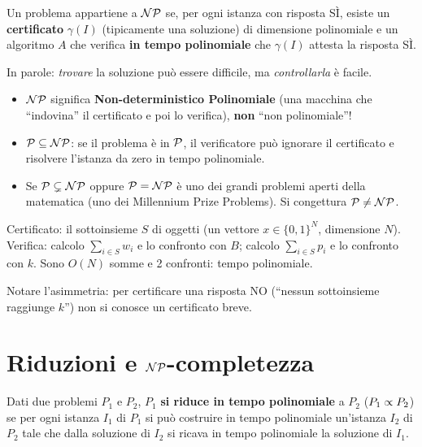 \begin{defbox}[classe $\NP$]
Un problema appartiene a $\NP$ se, per ogni istanza con risposta SÌ, esiste un \textbf{certificato} $\gamma(I)$ (tipicamente una soluzione) di dimensione polinomiale e un algoritmo $A$ che verifica \textbf{in tempo polinomiale} che $\gamma(I)$ attesta la risposta SÌ.
\end{defbox}
In parole: \emph{trovare} la soluzione può essere difficile, ma \emph{controllarla} è facile.

\begin{itemize}[nosep]
\item $\NP$ significa \textbf{Non-deterministico Polinomiale} (una macchina che ``indovina'' il certificato e poi lo verifica), \textbf{non} ``non polinomiale''!
\item $\mathcal{P}\subseteq\mathcal{NP}$: se il problema è in $\mathcal{P}$, il verificatore può ignorare il certificato e risolvere l'istanza da zero in tempo polinomiale.
\item Se $\mathcal{P}\subsetneq\mathcal{NP}$ oppure $\mathcal{P}=\mathcal{NP}$ è uno dei grandi problemi aperti della matematica (uno dei Millennium Prize Problems). Si congettura $\mathcal{P}\ne\mathcal{NP}$.
\end{itemize}

\begin{esbox}[lo zaino è in $\NP$]
Certificato: il sottoinsieme $S$ di oggetti (un vettore $x\in\{0,1\}^N$, dimensione $N$). Verifica: calcolo $\sum_{i\in S}w_i$ e lo confronto con $B$; calcolo $\sum_{i\in S}p_i$ e lo confronto con $k$. Sono $O(N)$ somme e 2 confronti: tempo polinomiale.
\end{esbox}
Notare l'asimmetria: per certificare una risposta NO (``nessun sottoinsieme raggiunge $k$'') non si conosce un certificato breve.

\section{Riduzioni e \texorpdfstring{$\NP$}{NP}-completezza}

\begin{defbox}
Dati due problemi $P_1$ e $P_2$, $P_1$ \textbf{si riduce in tempo polinomiale} a $P_2$ ($P_1\propto P_2$) se per ogni istanza $I_1$ di $P_1$ si può costruire in tempo polinomiale un'istanza $I_2$ di $P_2$ tale che dalla soluzione di $I_2$ si ricava in tempo polinomiale la soluzione di $I_1$.
\end{defbox}

